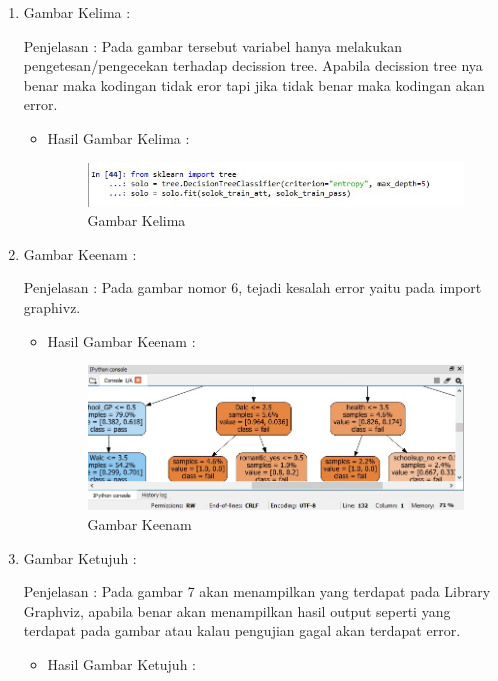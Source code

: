 \begin{itemize}
\begin{enumerate}
\begin{itemize}
\end{itemize}
\par
\item  Gambar Kelima :
\par Penjelasan : Pada gambar tersebut variabel hanya melakukan pengetesan/pengecekan terhadap decission tree. Apabila decission tree nya benar maka kodingan tidak eror tapi jika tidak benar maka kodingan akan error. 
\par 
\begin{itemize}
\par
\item Hasil  Gambar Kelima :

\begin{figure}[ht]
\centering
\includegraphics[scale=0.7]{figures/5.jpg}
\caption{ Gambar Kelima}
\label{5}
\end{figure}


\end{itemize}
\item  Gambar Keenam :
\par Penjelasan : Pada gambar nomor 6, tejadi kesalah error yaitu pada import graphivz.
\par 
\begin{itemize}
\par
\item Hasil  Gambar Keenam :

\begin{figure}[ht]
\centering
\includegraphics[scale=0.4]{figures/13.jpeg}
\caption{ Gambar Keenam}
\label{13}
\end{figure}


\end{itemize}
\item  Gambar Ketujuh :
\par Penjelasan : Pada gambar 7 akan menampilkan yang terdapat pada Library Graphviz, apabila benar akan menampilkan hasil output seperti yang terdapat pada gambar atau kalau pengujian gagal akan terdapat error.
\par 
\begin{itemize}
\par
\item Hasil  Gambar Ketujuh :


\end{itemize}
\end{enumerate}
\end{itemize}
